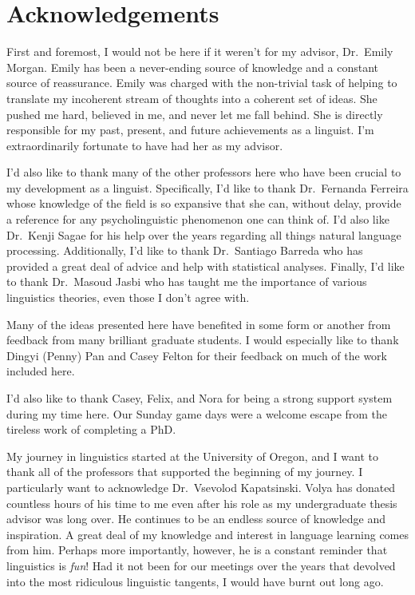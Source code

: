 \documentclass[
  12pt,
  letterpaper,
]{scrreport}
\renewcommand*\contentsname{Table of contents}
\newcommand\contentsname{Table of contents}
\begin{document}
\setcounter{page}{\value{savedpage}} %
\clearpage

\renewcommand*\contentsname{Table of contents}
{
\setcounter{tocdepth}{2}
\tableofcontents
}
\listoffigures
\listoftables


\chapter*{Acknowledgements}\label{sec-acknowledgements}


First and foremost, I would not be here if it weren't for my advisor,
Dr.~Emily Morgan. Emily has been a never-ending source of knowledge and
a constant source of reassurance. Emily was charged with the non-trivial
task of helping to translate my incoherent stream of thoughts into a
coherent set of ideas. She pushed me hard, believed in me, and never let
me fall behind. She is directly responsible for my past, present, and
future achievements as a linguist. I'm extraordinarily fortunate to have
had her as my advisor.

I'd also like to thank many of the other professors here who have been
crucial to my development as a linguist. Specifically, I'd like to thank
Dr.~Fernanda Ferreira whose knowledge of the field is so expansive that
she can, without delay, provide a reference for any psycholinguistic
phenomenon one can think of. I'd also like Dr.~Kenji Sagae for his help
over the years regarding all things natural language processing.
Additionally, I'd like to thank Dr.~Santiago Barreda who has provided a
great deal of advice and help with statistical analyses. Finally, I'd
like to thank Dr.~Masoud Jasbi who has taught me the importance of
various linguistics theories, even those I don't agree with.

Many of the ideas presented here have benefited in some form or another
from feedback from many brilliant graduate students. I would especially
like to thank Dingyi (Penny) Pan and Casey Felton for their feedback on
much of the work included here.

I'd also like to thank Casey, Felix, and Nora for being a strong support
system during my time here. Our Sunday game days were a welcome escape
from the tireless work of completing a PhD.

My journey in linguistics started at the University of Oregon, and I
want to thank all of the professors that supported the beginning of my
journey. I particularly want to acknowledge Dr.~Vsevolod Kapatsinski.
Volya has donated countless hours of his time to me even after his role
as my undergraduate thesis advisor was long over. He continues to be an
endless source of knowledge and inspiration. A great deal of my
knowledge and interest in language learning comes from him. Perhaps more
importantly, however, he is a constant reminder that linguistics is
\emph{fun}! Had it not been for our meetings over the years that
devolved into the most ridiculous linguistic tangents, I would have
burnt out long ago.
\end{document}
